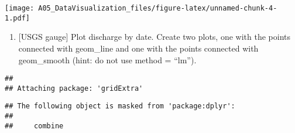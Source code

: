 \documentclass[]{article}
\newenvironment{Shaded}{\begin{snugshade}}{\end{snugshade}}
\newcommand{\KeywordTok}[1]{\textcolor[rgb]{0.13,0.29,0.53}{\textbf{#1}}}
\newcommand{\DataTypeTok}[1]{\textcolor[rgb]{0.13,0.29,0.53}{#1}}
\newcommand{\StringTok}[1]{\textcolor[rgb]{0.31,0.60,0.02}{#1}}
\newcommand{\CommentTok}[1]{\textcolor[rgb]{0.56,0.35,0.01}{\textit{#1}}}
\newcommand{\OperatorTok}[1]{\textcolor[rgb]{0.81,0.36,0.00}{\textbf{#1}}}
\newcommand{\NormalTok}[1]{#1}
\providecommand{\tightlist}{%
  \setlength{\itemsep}{0pt}\setlength{\parskip}{0pt}}
\begin{document}
\begin{Shaded}
\end{Shaded}

\texttt{[image: A05\_DataVisualization\_files/figure-latex/unnamed-chunk-4-1.pdf]}

\begin{enumerate}
\def\labelenumi{\arabic{enumi}.}
\setcounter{enumi}{5}
\tightlist
\item
  {[}USGS gauge{]} Plot discharge by date. Create two plots, one with
  the points connected with geom\_line and one with the points connected
  with geom\_smooth (hint: do not use method = ``lm'').
\end{enumerate}

\begin{Shaded}
\end{Shaded}

\begin{verbatim}
## 
## Attaching package: 'gridExtra'
\end{verbatim}

\begin{verbatim}
## The following object is masked from 'package:dplyr':
## 
##     combine
\end{verbatim}
\end{document}
